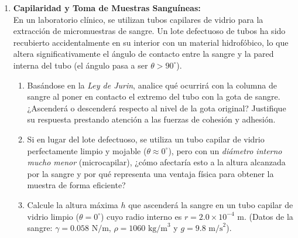 \documentclass[10pt,letterpaper]{article}
\begin{document}
\begin{enumerate}[leftmargin=*]
    \item \textbf{Capilaridad y Toma de Muestras Sanguíneas:}\\
    En un laboratorio clínico, se utilizan tubos capilares de vidrio para la extracción de micromuestras de sangre. Un lote defectuoso de tubos ha sido recubierto accidentalmente en su interior con un material hidrofóbico, lo que altera significativamente el ángulo de contacto entre la sangre y la pared interna del tubo (el ángulo pasa a ser $\theta > 90^\circ$).
    \begin{enumerate}
        \item Basándose en la \textit{Ley de Jurin}, analice qué ocurrirá con la columna de sangre al poner en contacto el extremo del tubo con la gota de sangre. ¿Ascenderá o descenderá respecto al nivel de la gota original? Justifique su respuesta prestando atención a las fuerzas de cohesión y adhesión.
        \item Si en lugar del lote defectuoso, se utiliza un tubo capilar de vidrio perfectamente limpio y mojable ($\theta \approx 0^\circ$), pero con un \textit{diámetro interno mucho menor} (microcapilar), ¿cómo afectaría esto a la altura alcanzada por la sangre y por qué representa una ventaja física para obtener la muestra de forma eficiente?
        \item Calcule la altura máxima $h$ que ascenderá la sangre en un tubo capilar de vidrio limpio ($\theta = 0^\circ$) cuyo radio interno es $r = 2.0 \times 10^{-4} \text{ m}$. (Datos de la sangre: $\gamma = 0.058 \text{ N/m}$, $\rho = 1060 \text{ kg/m}^3$ y $g = 9.8 \text{ m/s}^2$).
    \end{enumerate}

\end{enumerate}
\end{document}
